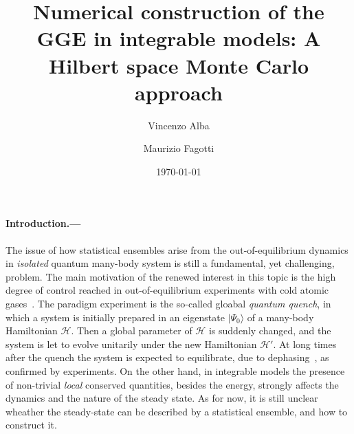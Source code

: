 \documentclass[twocolumn,superscriptaddress,prb,10pt]{revtex4-1}
\begin{document}
\title{Numerical construction of the GGE in integrable models: A Hilbert space Monte Carlo 
approach} 

\author{Vincenzo Alba}

\author{Maurizio Fagotti}

\date{\today}




\begin{abstract} 


\end{abstract}


\maketitle


\paragraph*{Introduction.---}

The issue of how statistical ensembles arise from the out-of-equilibrium 
dynamics in {\it isolated} quantum many-body system is still a fundamental, 
yet challenging, problem. The main motivation of the renewed interest 
in this topic is the high degree of control reached in out-of-equilibrium 
experiments with cold atomic gases~\cite{greiner-2002,kinoshita-2006,
hofferberth-2007,bloch-2008,trotzky-2012,gring-2012,cheneau-2012,
schneider-2012,kunhert-2013,langen-2013,meinert-2013,fukuhara-2013,
ronzheimer-2013,braun-2014}. 
The paradigm experiment is the so-called gloabal {\it quantum quench}, in 
which a system is initially prepared in an eigenstate $|\Psi_0\rangle$ of a 
many-body Hamiltonian ${\mathcal H}$. Then a global parameter of ${\mathcal H}$ 
is suddenly changed, and the system is let to evolve unitarily under the 
new Hamiltonian ${\mathcal H}'$. 
At long times after the quench the system is expected to equilibrate, due to 
dephasing~\cite{barthel-2008}, as confirmed by experiments. 
On the other hand, in integrable models the 
presence of non-trivial {\it local} conserved quantities, besides the energy, 
strongly affects the dynamics and the nature of the steady state. As for now,  
it is still unclear wheather the steady-state can be described by a statistical 
ensemble, and how to construct it. 
\end{document}
